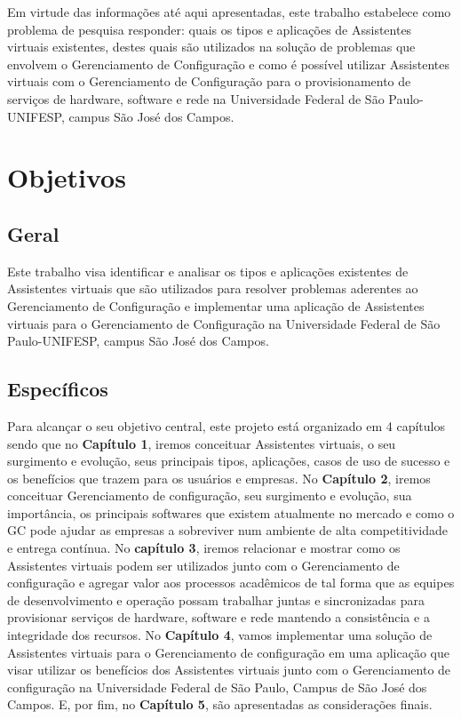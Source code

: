 \documentclass[quali]{mpit}
\begin{document}
Em virtude das informações até aqui apresentadas, este trabalho estabelece como problema de pesquisa responder: quais os tipos e aplicações de Assistentes virtuais existentes,  destes quais são utilizados na solução de problemas que envolvem o Gerenciamento de Configuração e como é possível utilizar Assistentes virtuais com o Gerenciamento de Configuração para o provisionamento de serviços de hardware, software e rede na Universidade Federal de São Paulo-UNIFESP, campus São José dos Campos.

\section{Objetivos}

\subsection{Geral}
Este trabalho visa identificar e analisar os tipos e aplicações existentes de Assistentes virtuais que são utilizados para resolver problemas aderentes ao Gerenciamento de Configuração e implementar uma aplicação de Assistentes virtuais para o Gerenciamento de Configuração na Universidade Federal de São Paulo-UNIFESP, campus São José dos Campos.

\subsection{Específicos}
Para alcançar o seu objetivo central, este projeto está organizado em 4 capítulos sendo que no \textbf{Capítulo 1}, iremos conceituar Assistentes virtuais, o seu surgimento e evolução, seus principais tipos, aplicações, casos de uso de sucesso e os benefícios que trazem para os usuários e empresas.
No \textbf{Capítulo 2}, iremos conceituar Gerenciamento de configuração, seu surgimento e evolução, sua importância, os principais softwares que existem atualmente no mercado e como o GC pode ajudar as empresas a sobreviver num ambiente de alta competitividade e entrega contínua.
No \textbf{capítulo 3}, iremos relacionar e mostrar como os Assistentes virtuais podem ser utilizados junto com o Gerenciamento de configuração e agregar valor aos processos acadêmicos de tal forma que as equipes de desenvolvimento e operação possam trabalhar juntas e sincronizadas para provisionar serviços de hardware, software e rede mantendo a consistência e a integridade dos recursos. No \textbf{Capítulo 4}, vamos implementar uma solução de Assistentes virtuais para o Gerenciamento de configuração em uma aplicação que visar utilizar os benefícios dos Assistentes virtuais junto com o Gerenciamento de configuração na Universidade Federal de São Paulo, Campus de São José dos Campos. E, por fim, no \textbf{Capítulo 5}, são apresentadas as considerações finais.
\end{document}
